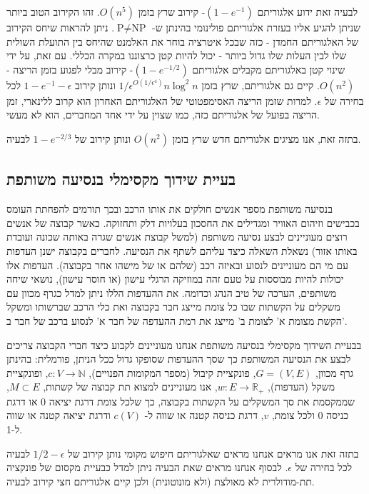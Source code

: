 \begin{hebrew}
לבעיה זאת ידוע אלגוריתם
$(1-e^{-1})$-%
קירוב שרץ בזמן
$O(n^5)$.
זהו הקירוב הטוב ביותר שניתן להגיע אליו בעזרת אלגוריתם פולינומי בהינתן ש-%
$\text{P} \neq \text{NP}$.
ניתן להראות שיחס הקירוב של האלגוריתם החמדן - כזה שבכל איטרציה בוחר את האלמנט שהיחס בין התועלת השולית שלו לבין העלות שלו גדול ביותר - יכול להיות קטן כרצוננו במקרה הכללי.
עם זאת, על ידי שינוי קטן באלגוריתם מקבלים אלגוריתם
$(1 - e^{-1/2})$-%
קירוב מבלי לפגוע בזמן הריצה -
$O(n^2)$.
קיים גם אלגוריתם, שרץ בזמן
$1/\epsilon^{O(1/\epsilon^4)}n\log^2n$
ונותן קירוב
$1 - e^{-1} -\epsilon$
לכל בחירה של
$\epsilon$.
למרות שזמן הריצה האסימפטוטי של האלגוריתם האחרון הוא קרוב ללינארי, זמן הריצה בפועל של אלגוריתם כזה, כמו שצוין על ידי אחד המחברים, הוא לא מעשי.

בתזה זאת, אנו מציגים אלגוריתם חדש שרץ בזמן
$O(n^2)$
ונותן קירוב של
$1 - e^{-2/3}$
לבעיה.




\subsection*{\texthebrew{בעיית שידוך מקסימלי בנסיעה משותפת}}

בנסיעה משותפת מספר אנשים חולקים את אותו הרכב ובכך תורמים להפחתת העומס בכבישים וזיהום האוויר ומגדילים את החסכון בעלויות דלק ותחזוקה.
כאשר קבוצה של אנשים רוצים מעוניינים לבצע נסיעה משותפת (למשל קבוצת אנשים שגרה באותה שכונה ועובדת באותו אזור) נשאלת השאלה כיצד עליהם לשתף את הנסיעה.
לחברים בקבוצה ישנן העדפות עם מי הם מעוניינים לנסוע ובאיזה רכב (שלהם או של מישהו אחר בקבוצה).
העדפות אלו יכולות להיות מבוססות על טעם זהה במוזיקה הרגלי עישון (או חוסר עישון), נושאי שיחה משותפים, הערכה של טיב הנהג וכדומה.
את ההעדפות הללו ניתן למדל כגרף מכוון עם משקלים על הקשתות שבו כל צומת מייצג חבר בקבוצה ואת כלי הרכב שברשותו ומשקל הקשת מצומת א' לצומת ב' מייצג את רמת ההעדפה של חבר א' לנסוע ברכב של חבר ב'.

בבעיית השידוך מקסימלי בנסיעה משותפת אנחנו מעוניינים לקבוע כיצד חברי הקבוצה צריכים לבצע את הנסיעה המשותפת כך שסך ההעדפות שסופקו גדול ככל הניתן, פורמלית:
בהינתן גרף מכוון,
$G = (V, E)$,
פונקציית קיבול (מספר המקומות הפנויים),
$c:V \to \mathbb{N}$,
ופונקציית משקל (העדפות),
$w:E \to \mathbb{R}_+$,
אנו מעוניינים למצוא תת קבוצה של קשתות,
$M \subset E$,
שממקסמת את סך המשקלים על הקשתות בקבוצה, כך שלכל צומת דרגת יציאה 0 או דרגת כניסה 0 ולכל צומת,
$v$,
דרגת כניסה קטנה או שווה ל-%
$c(V)$
ודרגת יציאה קטנה או שווה ל-1.

בתזה זאת אנו מראים אנחנו מראים שאלגוריתם חיפוש מקומי נותן קירוב של
$1/2 - \epsilon$
לבעיה לכל בחירה של
$\epsilon$.
לבסוף אנחנו מראים שאת הבעיה ניתן למדל כבעיית מקסום של פונקציה תת-מודולרית לא מאולצת (ולא מונוטונית) ולכן קיים אלגוריתם חצי קירוב לבעיה.




\end{hebrew}
